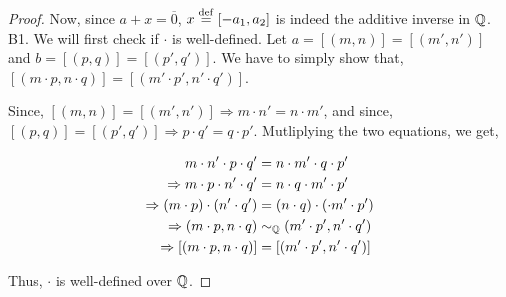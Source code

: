 \documentclass[11pt]{scrartcl}
\begin{document}
\begin{proof}
	Now, since $a+x = \overline{0}$, $x \overset{\mathrm{def}}{=} [-a_{1}, a_{2}]$ is indeed the additive inverse in $\mathbb Q$.\\[2pt]
	
	B1. We will first check if $\cdot$ is well-defined. Let $a = [(m,n)] = [(m',n')]$ and $b = [(p,q)] = [(p',q')]$. We have to simply show that, $[(m\cdot p, n \cdot q)] = [(m' \cdot p', n' \cdot q')]$.
	
	Since, $[(m,n)] = [(m',n')] \Rightarrow m\cdot n' = n\cdot m'$, and since, $[(p,q)] = [(p',q')] \Rightarrow p \cdot q' = q \cdot p'$. Mutliplying the two equations, we get,
	
	\begin{align*}
		m\cdot n' \cdot p \cdot q' &= n \cdot m' \cdot q \cdot p'\\
		\Rightarrow m \cdot p \cdot n' \cdot q' &= n \cdot q \cdot m' \cdot p'\\
		\Rightarrow (m \cdot p)\cdot(  n' \cdot q') &= (n \cdot q)\cdot( \cdot m' \cdot p')\\
		\Rightarrow (m\cdot p, n\cdot q) &\sim_{\mathbb Q} (m' \cdot p', n' \cdot q')\\
		\Rightarrow [(m\cdot p, n\cdot q)] &= [(m' \cdot p', n' \cdot q')]
	\end{align*}
	
	Thus, $\cdot$ is well-defined over $\mathbb Q$.
\end{proof}
\end{document}

